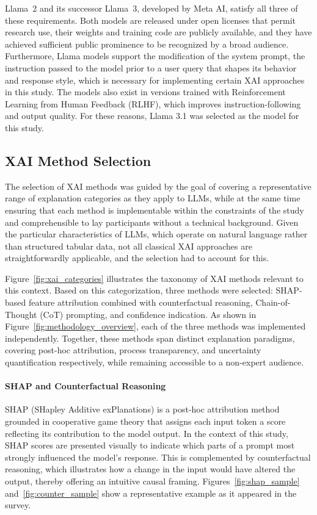 Llama~2 and its successor Llama~3, developed by Meta AI, satisfy all three of these requirements. Both models are released under open licenses that permit research use, their weights and training code are publicly available, and they have achieved sufficient public prominence to be recognized by a broad audience. Furthermore, Llama models support the modification of the system prompt, the instruction passed to the model prior to a user query that shapes its behavior and response style, which is necessary for implementing certain XAI approaches in this study. The models also exist in versions trained with Reinforcement Learning from Human Feedback (RLHF), which improves instruction-following and output quality. For these reasons, Llama 3.1\cite{noauthor_llama_nodate} was selected as the model for this study.

\subsection{XAI Method Selection}

The selection of XAI methods was guided by the goal of covering a representative range of explanation categories as they apply to LLMs, while at the same time ensuring that each method is implementable within the constraints of the study and comprehensible to lay participants without a technical background. Given the particular characteristics of LLMs, which operate on natural language rather than structured tabular data, not all classical XAI approaches are straightforwardly applicable, and the selection had to account for this.

Figure~\ref{fig:xai_categories} illustrates the taxonomy of XAI methods relevant to this context. Based on this categorization, three methods were selected: SHAP-based feature attribution combined with counterfactual reasoning, Chain-of-Thought (CoT) prompting, and confidence indication. As shown in Figure~\ref{fig:methodology_overview}, each of the three methods was implemented independently. Together, these methods span distinct explanation paradigms, covering post-hoc attribution, process transparency, and uncertainty quantification respectively, while remaining accessible to a non-expert audience.

\paragraph{SHAP and Counterfactual Reasoning} 
SHAP (SHapley Additive exPlanations)\cite{lundberg_unified_2017} is a post-hoc attribution method grounded in cooperative game theory that assigns each input token a score reflecting its contribution to the model output. In the context of this study, SHAP scores are presented visually to indicate which parts of a prompt most strongly influenced the model's response. This is complemented by counterfactual reasoning, which illustrates how a change in the input would have altered the output, thereby offering an intuitive causal framing. Figures~\ref{fig:shap_sample} and~\ref{fig:counter_sample} show a representative example as it appeared in the survey.

